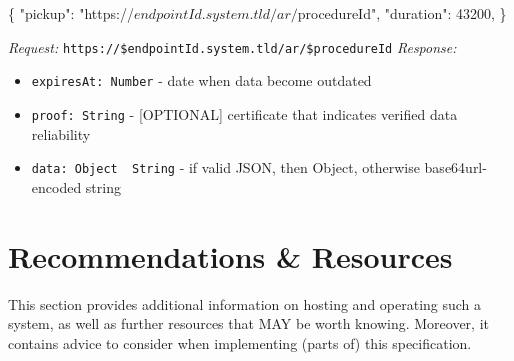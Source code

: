 \documentclass[12pt,english,a4paper,titlepage,cleardoublepage=empty,dottedtoc]{report}
\newenvironment{Shaded}{\begin{snugshade}}{\end{snugshade}}
\newcommand{\DataTypeTok}[1]{\textcolor[rgb]{0.13,0.29,0.53}{#1}}
\newcommand{\DecValTok}[1]{\textcolor[rgb]{0.00,0.00,0.81}{#1}}
\newcommand{\StringTok}[1]{\textcolor[rgb]{0.31,0.60,0.02}{#1}}
\newcommand{\FunctionTok}[1]{\textcolor[rgb]{0.00,0.00,0.00}{#1}}
\newcommand{\ErrorTok}[1]{\textcolor[rgb]{0.64,0.00,0.00}{\textbf{#1}}}
\providecommand{\tightlist}{%
  \setlength{\itemsep}{0pt}\setlength{\parskip}{0pt}}
\begin{document}
\begin{Shaded}
\begin{Highlighting}[numbers=left,,]
\FunctionTok{\{}
    \DataTypeTok{"pickup"}\FunctionTok{:} \StringTok{"https://$endpointId.system.tld/ar/$procedureId"}\FunctionTok{,}
    \DataTypeTok{"duration"}\FunctionTok{:} \DecValTok{43200}\FunctionTok{,}
\FunctionTok{\}}
\end{Highlighting}
\end{Shaded}

\emph{Request:}
\texttt{https://\$endpointId.system.tld/ar/\$procedureId}
\emph{Response:}

\begin{itemize}
\tightlist
\item
  \texttt{expiresAt:\ Number} - date when data become outdated
\item
  \texttt{proof:\ String} - {[}OPTIONAL{]} certificate that indicates
  verified data reliability
\item
  \texttt{data:\ Object\ \textbar{}\textbar{}\ String} - if valid JSON,
  then Object, otherwise base64url-encoded string
\end{itemize}

\begin{Shaded}
\end{Shaded}

\section{Recommendations \& Resources}\label{recommendations-resources}

This section provides additional information on hosting and operating
such a system, as well as further resources that MAY be worth knowing.
Moreover, it contains advice to consider when implementing (parts of)
this specification.
\end{document}
